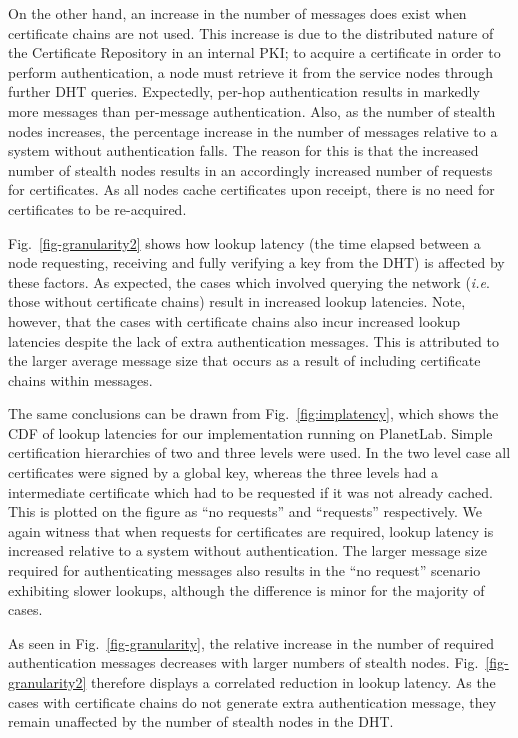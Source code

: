 \documentclass{elsart3p}
\begin{document}
On the other hand, an increase in the number of messages does exist
when certificate chains are not used. This increase is due to the
distributed nature of the Certificate Repository in an internal PKI;
to acquire a certificate in order to perform authentication, a node
must retrieve it from the service nodes through further DHT queries.
Expectedly, per-hop authentication results in markedly more messages
than per-message authentication. Also, as the number of stealth
nodes increases, the percentage increase in the number of messages
relative to a system without authentication falls. The reason for
this is that the increased number of stealth nodes results in an
accordingly increased number of requests for certificates. As all
nodes cache certificates upon receipt, there is no need for
certificates to be re-acquired.

Fig.~\ref{fig-granularity2} shows how lookup latency (the time
elapsed between a node requesting, receiving and fully verifying a
key from the DHT) is affected by these factors. As expected, the
cases which involved querying the network (\emph{i.e}. those without
certificate chains) result in increased lookup latencies. Note,
however, that the cases with certificate chains also incur increased
lookup latencies despite the lack of extra authentication messages.
This is attributed to the larger average message size that occurs as
a result of including certificate chains within messages.

The same conclusions can be drawn from Fig.~\ref{fig:implatency},
which shows the CDF of lookup latencies for our implementation
running on PlanetLab. Simple certification hierarchies of two and
three levels were used. In the two level case all certificates were
signed by a global key, whereas the three levels had a intermediate certificate
which had to be requested if it was not already cached. This is plotted on the figure as
``no requests'' and ``requests'' respectively. We again witness that
when requests for certificates are required, lookup latency is
increased relative to a system without authentication. The larger
message size required for authenticating messages also results in
the ``no request'' scenario exhibiting slower lookups, although the
difference is minor for the majority of cases.

As seen in Fig.~\ref{fig-granularity}, the relative increase in the
number of required authentication messages decreases with larger
numbers of stealth nodes. Fig.~\ref{fig-granularity2} therefore
displays a correlated reduction in lookup latency. As the cases with
certificate chains do not generate extra authentication message,
they remain unaffected by the number of stealth nodes in the DHT.
\end{document}

